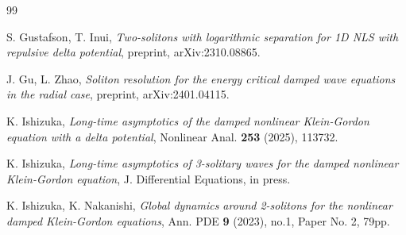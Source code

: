 \documentclass[reqno]{amsart}
\theoremstyle{plain}
\theoremstyle{definition}
\numberwithin{equation}{section}
\newcommand{\1}{\mathbbm{1}}
\begin{document}
\begin{thebibliography}{99}



 S. Gustafson, T. Inui,
\textit{Two-solitons with logarithmic separation for 1D NLS with repulsive delta potential},
preprint, arXiv:2310.08865.






 J. Gu, L. Zhao,
\textit{Soliton resolution for the energy critical damped wave equations in the radial case},
preprint, arXiv:2401.04115.







 K. Ishizuka,
\textit{Long-time asymptotics of the damped nonlinear Klein-Gordon equation with a delta potential},
Nonlinear Anal. \textbf{253} (2025), 113732. 

 K. Ishizuka,
\textit{Long-time asymptotics of 3-solitary waves for the damped nonlinear Klein-Gordon equation},
J. Differential Equations, in press.



 K. Ishizuka, K. Nakanishi,
\textit{Global dynamics around 2-solitons for the nonlinear damped Klein-Gordon equations},
Ann. PDE \textbf{9} (2023), no.1, Paper No. 2, 79pp.






\end{thebibliography}
\end{document}
